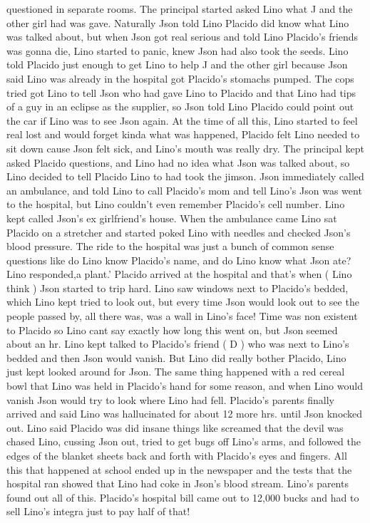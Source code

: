\documentclass[12pt]{book}
\begin{document}
questioned in separate rooms. The principal started asked Lino what J and the other girl had was gave. Naturally Json told Lino Placido did know what Lino was talked about, but when Json got real serious and told Lino Placido's friends was gonna die, Lino started to panic, knew Json had also took the seeds. Lino told Placido just enough to get Lino to help J and the other girl because Json said Lino was already in the hospital got Placido's stomachs pumped. The cops tried got Lino to tell Json who had gave Lino to Placido and that Lino had tips of a guy in an eclipse as the supplier, so Json told Lino Placido could point out the car if Lino was to see Json again. At the time of all this, Lino started to feel real lost and would forget kinda what was happened, Placido felt Lino needed to sit down cause Json felt sick, and Lino's mouth was really dry. The principal kept asked Placido questions, and Lino had no idea what Json was talked about, so Lino decided to tell Placido Lino to had took the jimson. Json immediately called an ambulance, and told Lino to call Placido's mom and tell Lino's Json was went to the hospital, but Lino couldn't even remember Placido's cell number. Lino kept called Json's ex girlfriend's house. When the ambulance came Lino sat Placido on a stretcher and started poked Lino with needles and checked Json's blood pressure. The ride to the hospital was just a bunch of common sense questions like do Lino know Placido's name, and do Lino know what Json ate? Lino responded,a plant.' Placido arrived at the hospital and that's when ( Lino think ) Json started to trip hard. Lino saw windows next to Placido's bedded, which Lino kept tried to look out, but every time Json would look out to see the people passed by, all there was, was a wall in Lino's face! Time was non existent to Placido so Lino cant say exactly how long this went on, but Json seemed about an hr. Lino kept talked to Placido's friend ( D ) who was next to Lino's bedded and then Json would vanish. But Lino did really bother Placido, Lino just kept looked around for Json. The same thing happened with a red cereal bowl that Lino was held in Placido's hand for some reason, and when Lino would vanish Json would try to look where Lino had fell. Placido's parents finally arrived and said Lino was hallucinated for about 12 more hrs. until Json knocked out. Lino said Placido was did insane things like screamed that the devil was chased Lino, cussing Json out, tried to get bugs off Lino's arms, and followed the edges of the blanket sheets back and forth with Placido's eyes and fingers. All this that happened at school ended up in the newspaper and the tests that the hospital ran showed that Lino had coke in Json's blood stream. Lino's parents found out all of this. Placido's hospital bill came out to 12,000 bucks and had to sell Lino's integra just to pay half of that!
\end{document}
